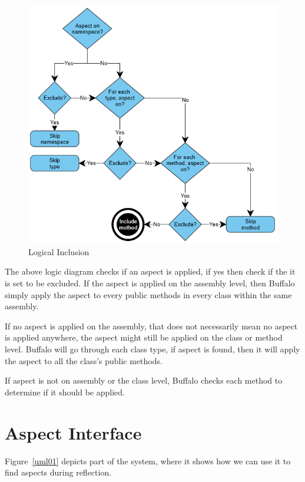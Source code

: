 \begin{figure}[H]
  \includegraphics[scale=1.0]{AspectLogicalInclusion.PNG}
  \centering
  \caption{Logical Inclusion\label{logical_inclusion}}
\end{figure}

The above logic diagram checks if an aspect is applied, if yes then check if the it is set to be excluded. If the aspect is applied on the assembly level, then Buffalo simply apply the aspect to every public methods in every class within the same assembly.

If no aspect is applied on the assembly, that does not necessarily mean no aspect is applied anywhere, the aspect might still be applied on the class or method level. Buffalo will go through each class type, if aspect is found, then it will apply the aspect to all the class’s public methods.

If aspect is not on assembly or the class level, Buffalo checks each method to determine if it should be applied.

\section{Aspect Interface}

Figure~\ref{uml01} depicts part of the system, where it shows how we can use it to find aspects during reflection.

